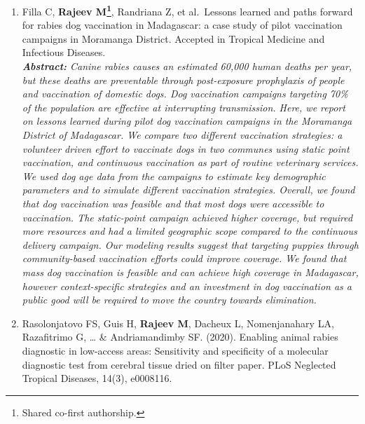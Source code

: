 \documentclass[
  oneside]{book}
\begin{document}
\begin{enumerate}
\def\labelenumi{\arabic{enumi}.}
\item
  Filla C, \textbf{Rajeev M\footnote{Shared co-first authorship.}}, Randriana Z, et al.~Lessons learned and paths forward for rabies dog vaccination in Madagascar: a case study of pilot vaccination campaigns in Moramanga District. Accepted in Tropical Medicine and Infectious Diseases.\\
  \emph{\textbf{Abstract:} Canine rabies causes an estimated 60,000 human deaths per year, but these deaths are preventable through post-exposure prophylaxis of people and vaccination of domestic dogs. Dog vaccination campaigns targeting 70\% of the population are effective at interrupting transmission. Here, we report on lessons learned during pilot dog vaccination campaigns in the Moramanga District of Madagascar. We compare two different vaccination strategies: a volunteer driven effort to vaccinate dogs in two communes using static point vaccination, and continuous vaccination as part of routine veterinary services. We used dog age data from the campaigns to estimate key demographic parameters and to simulate different vaccination strategies. Overall, we found that dog vaccination was feasible and that most dogs were accessible to vaccination. The static-point campaign achieved higher coverage, but required more resources and had a limited geographic scope compared to the continuous delivery campaign. Our modeling results suggest that targeting puppies through community-based vaccination efforts could improve coverage. We found that mass dog vaccination is feasible and can achieve high coverage in Madagascar, however context-specific strategies and an investment in dog vaccination as a public good will be required to move the country towards elimination.}
\item
  Rasolonjatovo FS, Guis H, \textbf{Rajeev M}, Dacheux L, Nomenjanahary LA, Razafitrimo G, \ldots{} \& Andriamandimby SF. (2020). Enabling animal rabies diagnostic in low-access areas: Sensitivity and specificity of a molecular diagnostic test from cerebral tissue dried on filter paper. PLoS Neglected Tropical Diseases, 14(3), e0008116.\\

\end{enumerate}
\end{document}

